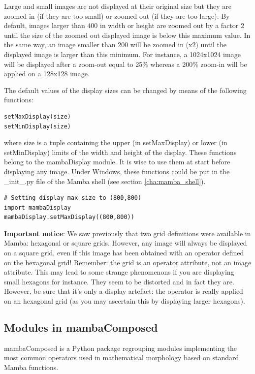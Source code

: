 \documentclass[a4paper,10pt,oneside]{article}
\begin{document}
Large and small images are not displayed at their original size but they are
zoomed in (if they are too small) or zoomed out (if they are too large). By
default, images larger than 400 in width or height are zoomed out by a factor 2
until the size of the zoomed out displayed image is below this maximum value.
In the same way, an image smaller than 200 will be zoomed in (x2) until
the displayed image is larger than this minimum. For instance, a 1024x1024 image
will be displayed after a zoom-out equal to 25\% whereas a 200\% zoom-in will be
applied on a 128x128 image.

The default values of the display sizes can be changed by means of the following
functions:

\lstset{language=Python}
\begin{lstlisting}
setMaxDisplay(size)
setMinDisplay(size)
\end{lstlisting}

where size is a tuple containing the upper (in setMaxDisplay) or lower (in
setMinDisplay) limits of the width and height of the display.
These functions belong to the mambaDisplay module. It is wise to use them at
start before displaying any image. Under Windows, these functions could be put
in the \_init\_.py file of the Mamba shell (see section \ref{cha:mamba_shell}).

\lstset{language=Python}
\begin{lstlisting}
# Setting display max size to (800,800)
import mambaDisplay
mambaDisplay.setMaxDisplay((800,800))
\end{lstlisting}

\textbf{Important notice}: We saw previously that two grid definitions were 
available in Mamba: hexagonal or square grids. However, any image will always be 
displayed on a square grid, even if this image has been obtained with an operator 
defined on the hexagonal grid! Remember: the grid is an operator attribute, not an 
image attribute. This may lead to some strange phenomenons if you are displaying 
small hexagons for instance. They seem to be distorted and in fact they are. However, 
be sure that it's only a display artefact: the operator is really applied on an hexagonal 
grid (as you may ascertain this by displaying larger hexagons).

\subsection{Modules in mambaComposed}

mambaComposed is a Python package regrouping modules implementing the most 
common operators used in mathematical morphology based on standard Mamba 
functions.
\end{document}
